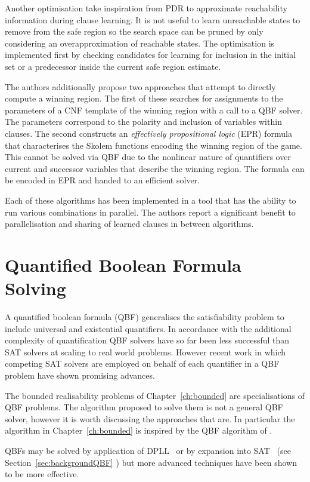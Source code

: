 Another optimisation take inspiration from PDR to approximate reachability information during clause learning. It is not useful to learn unreachable states to remove from the safe region so the search space can be pruned by only considering an overapproximation of reachable states. The optimisation is implemented first by checking candidates for learning for inclusion in the initial set or a predecessor inside the current safe region estimate.

The authors additionally propose two approaches that attempt to directly compute a winning region. The first of these searches for assignments to the parameters of a CNF template of the winning region with a call to a QBF solver. The parameters correspond to the polarity and inclusion of variables within clauses. The second constructs an \emph{effectively propositional logic} (EPR) formula that characterises the Skolem functions encoding the winning region of the game. This cannot be solved via QBF due to the nonlinear nature of quantifiers over current and successor variables that describe the winning region. The formula can be encoded in EPR and handed to an efficient solver.

Each of these algorithms has been implemented in a tool that has the ability to run various combinations in parallel. The authors report a significant benefit to parallelisation and sharing of learned clauses in between algorithms.

\section{Quantified Boolean Formula Solving}

A quantified boolean formula (QBF) generalises the satisfiability problem to include universal and existential quantifiers. In accordance with the additional complexity of quantification QBF solvers have so far been less successful than SAT solvers at scaling to real world problems. However recent work in which competing SAT solvers are employed on behalf of each quantifier in a QBF problem have shown promising advances.

The bounded realisability problems of Chapter~\ref{ch:bounded} are specialisations of QBF problems. The algorithm proposed to solve them is not a general QBF solver, however it is worth discussing the approaches that are. In particular the algorithm in Chapter~\ref{ch:bounded} is inspired by the QBF algorithm of \cite{Janota12}.

QBFs may be solved by application of DPLL~\cite{sdfsdf} or by expansion into SAT~\cite{Ayari02} (see Section~\ref{sec:backgroundQBF} ) but more advanced techniques have been shown to be more effective.

\subsection{}
